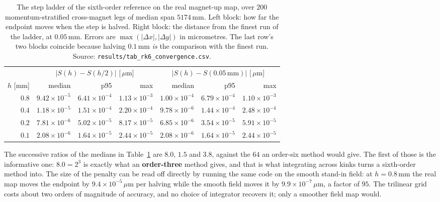 \documentclass[11pt,a4paper]{article}
\newcommand{\um}{\ensuremath{\,\mu\mathrm{m}}}
\newcommand{\mm}{\ensuremath{\,\mathrm{mm}}}
\begin{document}
\begin{table}[tbp]
  \centering
  \caption{The step ladder of the sixth-order reference on the real magnet-up
  map, over $200$ momentum-stratified cross-magnet legs of median span
  $5174\mm$. Left block: how far the endpoint moves when the step is halved.
  Right block: the distance from the finest run of the ladder, at $0.05\mm$.
  Errors are $\max(|\Delta x|, |\Delta y|)$ in micrometres. The last row's two
  blocks coincide because halving $0.1\mm$ \emph{is} the comparison with the
  finest run. Source: \texttt{results/tab\_rk6\_convergence.csv}.}
  \label{tab:rk6ladder}
  \small
  \setlength{\tabcolsep}{6pt}
  \begin{tabular}{rrrrrrr}
    \toprule
    & \multicolumn{3}{c}{$|S(h) - S(h/2)|$ [\um]} & \multicolumn{3}{c}{$|S(h) - S(0.05\mm)|$ [\um]} \\
    \cmidrule(lr){2-4}\cmidrule(lr){5-7}
    $h$ [mm] & median & p95 & max & median & p95 & max \\
    \midrule
    $0.8$ & $9.42\times 10^{-5}$ & $6.41\times 10^{-4}$ & $1.13\times 10^{-3}$ & $1.00\times 10^{-4}$ & $6.79\times 10^{-4}$ & $1.10\times 10^{-3}$ \\
    $0.4$ & $1.18\times 10^{-5}$ & $1.51\times 10^{-4}$ & $2.20\times 10^{-4}$ & $9.78\times 10^{-6}$ & $1.44\times 10^{-4}$ & $2.48\times 10^{-4}$ \\
    $0.2$ & $7.81\times 10^{-6}$ & $5.02\times 10^{-5}$ & $8.17\times 10^{-5}$ & $6.85\times 10^{-6}$ & $3.54\times 10^{-5}$ & $5.91\times 10^{-5}$ \\
    $0.1$ & $2.08\times 10^{-6}$ & $1.64\times 10^{-5}$ & $2.44\times 10^{-5}$ & $2.08\times 10^{-6}$ & $1.64\times 10^{-5}$ & $2.44\times 10^{-5}$ \\
    \bottomrule
  \end{tabular}
\end{table}

The successive ratios of the medians in Table~\ref{tab:rk6ladder} are
$\mathbf{8.0}$, $\mathbf{1.5}$ and $\mathbf{3.8}$, against the $64$ an order-six
method would give. The first of those is the informative one: $8.0 = 2^{3}$ is
exactly what an \textbf{order-three} method gives, and that is what integrating
across kinks turns a sixth-order method into. The size of the penalty can be read
off directly by running the same code on the smooth stand-in field: at
$h = 0.8\mm$ the real map moves the endpoint by $9.4 \times 10^{-5}\um$ per
halving while the smooth field moves it by $9.9 \times 10^{-7}\um$, a factor of
$95$. The trilinear grid costs about two orders of magnitude of accuracy, and no
choice of integrator recovers it; only a smoother field map would.
\end{document}
